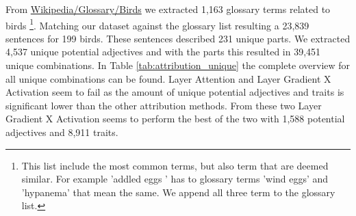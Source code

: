 \documentclass[a4paper, 12pt, oneside]{book} %
\begin{document}
From \href{https://en.wikipedia.org/wiki/Glossary_of_bird_terms}{Wikipedia/Glossary/Birds} we extracted 1,163 glossary terms related to birds \footnote{This list include the most common terms, but also term that are deemed similar. For example 'addled eggs ' has to glossary terms 'wind eggs' and 'hypanema' that mean the same. We append all three term to the glossary list.}.
Matching our dataset against the glossary list resulting a 23,839 sentences for 199 birds. 
These sentences described 231 unique parts. 
We extracted 4,537 unique potential adjectives and with the parts this resulted in 39,451 unique combinations.
In Table \ref{tab:attribution_unique} the complete overview for all unique combinations can be found.
Layer Attention and Layer Gradient X Activation seem to fail as the amount of unique potential adjectives and traits is significant lower than the other attribution methods.
From these two Layer Gradient X Activation seems to perform the best of the two with 1,588 potential adjectives and 8,911 traits.
\end{document}
